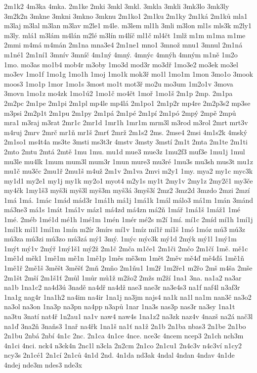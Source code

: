 2m1k2
4m3ka
4mka.
2m1ke
2mki
3mkl
3mkl.
3mkla
3mkli
3mk3lo
3mk3ly
3m2k2n
3mkne
3mkni
3mkno
3mknu
2m1ko1
2m1ku
2m1ky
2m1ká
2m1ků
mla1
m3laj
m3lal
m3lan
m3lav
m2le1
m4le.
m3lem
ml1h
3mli
m3lon
ml1s
mls3k
m2ly1
m3ly.
mlá1
m3lám
m4lán
m2lé
m3lín
m4líč
ml1č
ml4čt
1mlž
m1m
m1ma
m1me
2mmi
m4má
m4mán
2m1na
mna3e4
2m1ne1
mno1
3množ
mnu1
3mnul
2m1ná
m1né1
2m1ní1
3mnív
3mníč
4m1ný
4mný.
4mnýc
4mnýh
4mným
m1ně
1m2o
1mo.
mo3as
mo1b4
mob4r
m3oby
1mo3d
mod3r
mo3dř
1mo3e2
mo3ek
mo3el
mo3ev
1mo1f
1mo1g
1mo1h
1moj
1mo1k
mok3ř
mo1l
1mo1m
1mon
3mo1o
3mook
moos3
1mo1p
1mor
1mo1s
3most
mo1t
mot3ř
mo2u
mo3um
1m2o1v
3mova
3movn
1mo1z
mo4zk
1mo1ú2
1mo1č
mo4čt
1moř
1mo1š
2m1p
2mp.
2m1pa
2m2pc
2m1pe
2m1pi
2m1pl
mp4le
mp4lá
2m1po1
2m1p2r
mp4re
2m2p3s2
mp3se
m3psi
2m2p1t
2m1pu
2m1py
2m1pá
2m1pé
2m1pí
2m1pó
2mpý
2mpě
2mpů
mra1
m3raj
m3rat
2mr1c
2mr1d
1mr1h
1mr1m
mrm3l
m3rod
m3rol
2mrt
mrt3v
m4ruj
2mrv
2mrč
mr1ň
mr1š
2mrť
2mrž
2m1s2
2ms.
2mse4
2msi
4m1s2k
4mský
2m1so1
ms4t4a
ms3te
3msti
ms3t3r
4mstv
3msty
3mstí
2m1t
2mta
2m1te
2m1ti
2mto
2mtu
2mtá
2mtě
1mu
1mu.
mu1d
mue3
mue3z
1mu2f3
muf3e
1mu1j
1mul
mu3le
mu4lk
1mum
mum3l
mum3r
1mun
mure3
mu3ré
1mu3s
mu3sh
mus3t
mu1z
mu1č
mu3čc
2mu1ř
2mu1š
m4už
2m1v
2m1va
2mvi
m2y1
1my.
mya2
my1c
myc3k
my1d1
my2e1
my1j
my1k
my2o1
myot4
m2y1s
my1t
2my1v
2my1z
2my2č1
my3če
my4čk
1my1š3
myš3i
myš3l
myš3m
myš3á
3myš3í
2mz2
3mz2d
3mzdo
2mzi
2mzí
1má
1má.
1mác
1mád
mád3r
1má1h
má1j
1má1k
1mál
málo3
má1m
1mán
3mánd
má3ne3
má1s
1mát
1má1v
máz1
má4zd
má4zn
má2ň
1mář
1má1š
1máž1
1mé
1mé.
2méb
1mé1d
mé1h
1mé1m
1mén
1mér
mé2s
m2í
1mí.
mí1c
2míd
mí1h
1mí1j
1mí1k
mí1l
1mí1m
1mín
m2ír
3mírs
mí1v
1míz
mí1ř
mí1š
1mó
1móz
mú3
mú3z
mú3za
mú3zi
mú3zo
mú3zá
mý1
3mý.
1mýc
mýc3k
mý1d
2mýk
mý1l
1mý1m
1mýt
mý1v
2mýř
1mý1š1
mý2ž
2m1č
2mča
m1če1
2m1či
2mčo
2m1čí
1mě.
mě1c
1mě1d
měk1
1mě1m
mě1n
1mě1p
1měs
mě3sm
1mět
2měv
mě4ď
mě4ďá
1mě1ň
1mě1ř
2mě1š
3měšt
3měšť
2mň
2mňo
2m1ňu1
1m2ř
1m2ře1
m2řo
2mš
m4ša
2mše
2m1št
2mší
2m1š1ť
2můl
1můr
mů1ž
m2žo2
2mžs
m2ží
1na1
3na.
na1a2
na3ar
na1b
1na1c2
na4d3ú
3nadě
na4dř
na4dž
nae3
nae3r
na3e4s3
na1f
naf4l
n3af3r
1na1g
nag4r
1na1h2
na4im
na4ir
1na1j
na3jm
najs4
na1k
na1l
na1m
nan3č
na3o2
na3ol
na3on
1na3p
na3pn
na4pp
n3apů
1nar
1na3s
nas3p
nas3r
na3sy
1na1t
na3tu
3natí
nat4ř
1n2au1
na1v
naw4
naw4s
1na1z2
na3zk
naz4v
4nazš
na2á
nač3l
na1ď
3na2ň
3naňs3
1nař
na4řk
1na1š
na1ť
na1ž
2n1b
2n1ba
nbas3
2n1be
2n1bo
2n1bu
2nbá
2nbí
4n1c
2nc.
2n1ca
4n1ce
4nce.
nce3c
4ncem
ncep3
2n1ch
nch3m
4n1ci
4nci.
nck4
n3ck4n
2nc1l
n3cla
2n2cm
2n1co
2n1cu1
2n4c3v
n4c3ví
n1cy2
ncy3s
2n1cé1
2n1cí
2n1ců
4n1d
2nd.
4n1da
nd3ak
4ndal
4ndan
4ndav
4n1de
4ndej
nde3m
ndes3
nde3x
